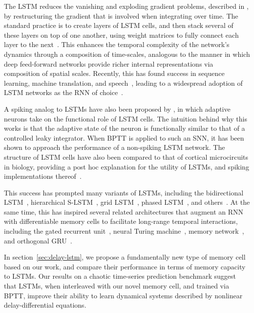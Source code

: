The LSTM reduces the vanishing and exploding gradient problems, described in \citet{bengio1994learning}, by restructuring the gradient that is involved when integrating over time.
The standard practice is to create layers of LSTM cells, and then stack several of these layers on top of one another, using weight matrices to fully connect each layer to the next~\citep{graves2013speech}.
This enhances the temporal complexity of the network's dynamics through a composition of time-scales, analogous to the manner in which deep feed-forward networks provide richer internal representations via composition of spatial scales.
Recently, this has found success in sequence learning, machine translation, and speech~\citep{graves2013speech, sutskever2014sequence, cho2014learning, bahdanau2014neural}, leading to a widespread adoption of LSTM networks as the RNN of choice~\citep{lecun2015deep}.

A spiking analog to LSTMs have also been proposed by \citet{bellec2018long}, in which adaptive neurons take on the functional role of LSTM cells.
The intuition behind why this works is that the adaptive state of the neuron is functionally similar to that of a controlled leaky integrator.
When BPTT is applied to such an SNN, it has been shown to approach the performance of a non-spiking LSTM network.
The structure of LSTM cells have also been compared to that of cortical microcircuits in biology, providing a post hoc explanation for the utility of LSTMs, and spiking implementations thereof~\citep{costa2017cortical, pozzi2018gating}.

This success has prompted many variants of LSTMs, including the bidirectional LSTM~\citep{graves2005framewise}, hierarchical S-LSTM~\citep{zhu2015long}, grid LSTM~\citep{kalchbrenner2015grid}, phased LSTM~\citep{neil2016phased}, and others~\citep{salehinejad2017recent}.
At the same time, this has inspired several related architectures that augment an RNN with differentiable memory cells to facilitate long-range temporal interactions, including the gated recurrent unit~\citep[GRU;][]{cho2014properties, chung2014empirical}, neural Turing machine~\citep{graves2014neural}, memory network~\citep{weston2014memory}, and orthogonal GRU~\citep{jing2018gated}.

In section~\ref{sec:delay-lstm}, we propose a fundamentally new type of memory cell based on our work, and compare their performance in terms of memory capacity to LSTMs.
Our results on a chaotic time-series prediction benchmark suggest that LSTMs, when interleaved with our novel memory cell, and trained via BPTT, improve their ability to learn dynamical systems described by nonlinear delay-differential equations.

